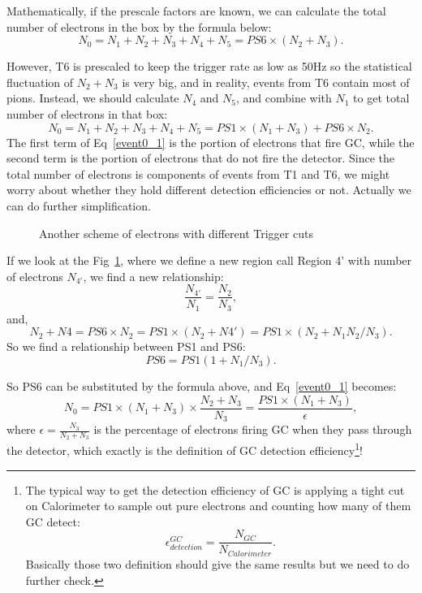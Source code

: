 \documentclass[a4paper,10.5pt]{article}
\begin{document}
Mathematically, if the prescale factors are known, we can calculate the total number of electrons in the box by the formula below:
\begin{equation}
 N_{0} = N_{1}+N_{2}+N_{3}+N_{4}+N_{5}=PS6\times(N_{2}+N_{3}).
\end{equation}

However, T6 is prescaled to keep the trigger rate as low as 50Hz so the statistical fluctuation of $N_{2}+N_{3}$ is very big, and in reality, events from T6 contain most of pions. Instead, we should calculate $N_{4}$ and $N_{5}$, and combine with $N_{1}$ to get total number of electrons in that box:
\begin{equation}
 N_{0} = N_{1}+N_{2}+N_{3}+N_{4}+N_{5}=PS1\times(N_{1}+N_{3})+PS6\times N_{2}.
\label{event0_1}
\end{equation}
 The first term of Eq~\ref{event0_1} is the portion of electrons that fire GC, while the second term is the portion of electrons that do not fire the detector. Since the total number of electrons is components of events from T1 and T6, we might worry about whether they hold different detection efficiencies or not. Actually we can do further simplification.

\begin{figure}[htb]
\centerline{}
\caption[Another scheme of electrons with different Trigger cuts]{\footnotesize{Another scheme of electrons with different Trigger cuts}
\label{trig_region2}}
\end{figure}
If we look at the Fig~\ref{trig_region2}, where we define a new region call Region 4' with number of electrons $N_{4'}$, we find a new relationship:
\begin{equation}
\frac{N_{4'}}{N_{1}}=\frac{N_{2}}{N_{3}},
\end{equation}
and,
\begin{equation}
N_{2}+N{4} = PS6\times N_{2} = PS1\times(N_{2}+N{4'}) = PS1\times(N_{2}+N_{1}N_{2}/N_{3}).
\end{equation}
So we find a relationship between PS1 and PS6:
\begin{equation}
 PS6 = PS1(1+N_{1}/N_{3}).
\end{equation}

 So PS6 can be substituted by the formula above, and Eq~\ref{event0_1} becomes:
\begin{equation}
 N_{0} = PS1\times(N_{1}+N_{3})\times \frac{N_{2}+N_{3}}{N_{3}}=\frac{PS1\times(N_{1}+N_{3})}{\epsilon},
\label{event0_2}
\end{equation}
where $\epsilon=\frac{N_{3}}{N_{2}+N_{3}}$ is the percentage of electrons firing GC when they pass through the detector, which exactly is the definition of GC detection efficiency\footnote{The typical way to get the detection efficiency of GC is applying a tight cut on Calorimeter to sample out pure electrons and counting how many of them GC detect: 
\begin{equation}
 \epsilon_{detection}^{GC}=\frac{N_{GC}}{N_{Calorimeter}}.
\end{equation}
Basically those two definition should give the same results but we need to do further check.
}!
\end{document}
